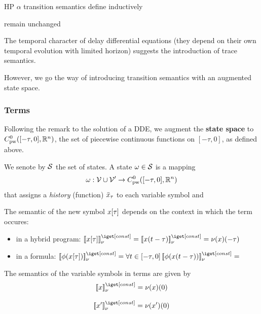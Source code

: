 \documentclass[10pt]{article}
\begin{document}
        HP $\alpha$ transition semantics define inductively

        remain unchanged

        The temporal character of delay differential equations (they depend on their own temporal evolution with limited horizon) suggests the introduction of trace semantics.

        However, we go the way of introducing transition semantics with an augmented state space.

        \subsubsection{Terms}
            \label{sec:terms-semantic}

            Following the remark to the solution of a DDE, we augment the \textbf{state space} to $C^0_\text{pw}([-\tau,0],\mathbb{R}^n)$, the set of piecewise continuous functions on $[-\tau,0]$, as defined above.


            We senote by $\mathcal{S}$ the set of states. A state $\omega\in\mathcal{S}$ is a mapping
            \begin{equation}
                \omega : \mathcal{V}\cup\mathcal{V'}\rightarrow C^0_\text{pw}([-\tau,0],\mathbb{R}^n)
            \end{equation}
            that assigns a \emph{history} (function) $\bar{x}_{\tau}$ to each variable symbol and


            The semantic of the new symbol $x[\tau]$ depends on the context in which the term occures:
            \begin{itemize}
                \item in a hybrid program: $\imodel[\nu]{}{\xtau} = \imodel[\nu]{}{x(t-\tau)} = \nu(x)(-\tau)$
                \item in a formula: $\imodel[\nu]{}{\phi(\xtau)} = \lforall{t\in[-\tau,0]}{\imodel[\nu]{}{\phi(x(t-\tau))}}=$
            \end{itemize}

            The semantics of the variable symbols in terms are given by
            \begin{equation}
                \imodel[\nu]{}{x}=\nu(x)(0)
            \end{equation}

            \begin{equation}
                \imodel[\nu]{}{x'}=\nu(x')(0)
            \end{equation}
\end{document}
